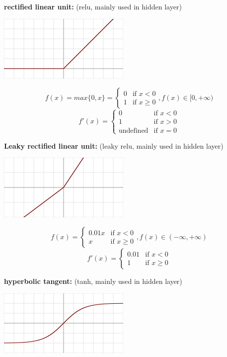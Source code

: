 \documentclass{article}
\begin{document}
\noindent \textbf{rectified linear unit:}  (relu, mainly used in hidden layer)

\begin{center}
\includegraphics[scale=0.6]{./images/relu.png}
\end{center}

\[f(x) = max\{0, x\} = \begin{cases}0&{\text{if }}x<0\\1&{\text{if }}x\geq 0\end{cases}, f(x) \in [0, +\infty)\]
\[f'(x) = \begin{cases}0&{\text{if }}x<0\\1&{\text{if }}x>0\\{\text{undefined}}&{\text{if }}x=0\end{cases}\]

\noindent \textbf{Leaky rectified linear unit:}  (leaky relu, mainly used in hidden layer)

\begin{center}
\includegraphics[scale=0.6]{./images/leaky_relu.png}
\end{center}

\[f(x) = \begin{cases}0.01x&{\text{if }}x<0\\x&{\text{if }}x\geq 0\end{cases}, f(x) \in (- \infty, + \infty)\]
\[f'(x) = \begin{cases}0.01&{\text{if }}x<0\\1&{\text{if }}x\geq 0\end{cases}\]

\noindent \textbf{hyperbolic tangent:} (tanh, mainly used in hidden layer)

\begin{center}
\includegraphics[scale=0.6]{./images/tanh.png}
\end{center}
\end{document}
